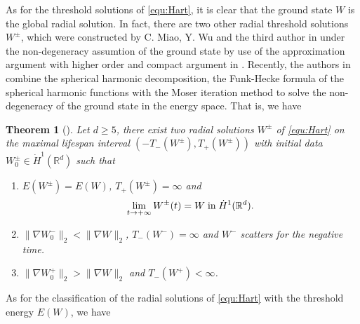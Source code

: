 \documentclass[reqno, 11pt]{amsart}
\numberwithin{equation}{section}
\newcommand{\R}{\mathbb{R}}
\theoremstyle{plain}
\newtheorem{theorem}{Theorem}
\theoremstyle{definition}
\numberwithin{equation}{section}
\numberwithin{theorem}{section}
\numberwithin{equation}{section}
\numberwithin{equation}{section}
\numberwithin{theorem}{section}
\begin{document}
	
	As for the threshold solutions of \eqref{equ:Hart}, it is clear that the ground state $W$ is the global radial solution. In fact, there are two other radial threshold solutions $W^{\pm}$, which were constructed by C.  Miao, Y. Wu and the third author in \cite{MWX:Hart} under the non-degeneracy  assumtion of the ground state by use of the approximation argument with higher order and compact argument in \cite{DMerle:NLS:ThreshSol, DMerle:NLW:ThreshSol, LiZh:NLS, LiZh:NLW}. Recently, the authors in \cite{LLTX:Nondeg, LLTX:g-Hart,LTX:Nondeg} combine the spherical harmonic decomposition, the Funk-Hecke formula of the spherical harmonic functions with the Moser iteration method to solve the non-degeneracy of the ground state in the energy space.  That is, we have
	
	\begin{theorem}[\cite{LLTX:g-Hart,MWX:Hart}]\label{thm:thresd sol} Let $d\geq 5$, there exist two radial solutions $W^\pm$ of \eqref{equ:Hart} on the maximal lifespan interval $(-T_{-}(W^{\pm}), T_{+}(W^{\pm}))$ with
		initial data $W^{\pm}_{0} \in \dot H^1(\R^d)$  such that
		\begin{enumerate}
			\item[\rm(a)] $E(W^\pm)=E(W)$, $T_+(W^{\pm})=\infty$ and
			\begin{equation*} \aligned
			\lim_{t\rightarrow +\infty}W^{\pm}(t) =  W \; \text{in} \; \dot H^1(\R^d).
			\endaligned
			\end{equation*}
			
			\item[\rm(b)] $\big\|\nabla W^-_0\big\|_{2} < \big\|\nabla W\big\|_{2}$, $T_-(W^{-})=\infty$ and $W^-$ scatters for the negative time.
			
			\item[\rm(c)] $\big\|\nabla W^+_0\big\|_{2} > \big\|\nabla W\big\|_{2}$ and $T_-(W^{+})<\infty$.
		\end{enumerate}
	\end{theorem}
	
	As for the classification of the radial solutions of \eqref{equ:Hart} with the threshold energy $E(W)$, we have 
	
\end{document}
